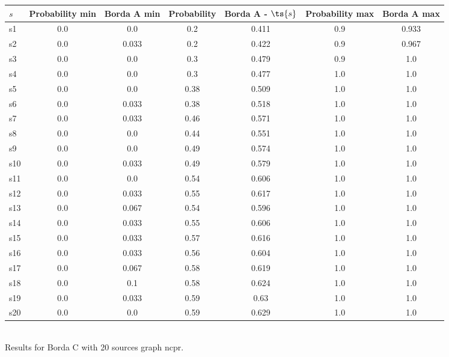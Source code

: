 \documentclass{article}
\begin{document}
\noindent\begin{tabular}{|l|c|c|c|c|c|c|}
\hline
$s$& Probability min & Borda A min & Probability & Borda A - $\ts{s}$ & Probability max & Borda A max\\
\hline
s1 &0.0 & 0.0 & 0.2 & 0.411 & 0.9 & 0.933\\
\hline
s2 &0.0 & 0.033 & 0.2 & 0.422 & 0.9 & 0.967\\
\hline
s3 &0.0 & 0.0 & 0.3 & 0.479 & 0.9 & 1.0\\
\hline
s4 &0.0 & 0.0 & 0.3 & 0.477 & 1.0 & 1.0\\
\hline
s5 &0.0 & 0.0 & 0.38 & 0.509 & 1.0 & 1.0\\
\hline
s6 &0.0 & 0.033 & 0.38 & 0.518 & 1.0 & 1.0\\
\hline
s7 &0.0 & 0.033 & 0.46 & 0.571 & 1.0 & 1.0\\
\hline
s8 &0.0 & 0.0 & 0.44 & 0.551 & 1.0 & 1.0\\
\hline
s9 &0.0 & 0.0 & 0.49 & 0.574 & 1.0 & 1.0\\
\hline
s10 &0.0 & 0.033 & 0.49 & 0.579 & 1.0 & 1.0\\
\hline
s11 &0.0 & 0.0 & 0.54 & 0.606 & 1.0 & 1.0\\
\hline
s12 &0.0 & 0.033 & 0.55 & 0.617 & 1.0 & 1.0\\
\hline
s13 &0.0 & 0.067 & 0.54 & 0.596 & 1.0 & 1.0\\
\hline
s14 &0.0 & 0.033 & 0.55 & 0.606 & 1.0 & 1.0\\
\hline
s15 &0.0 & 0.033 & 0.57 & 0.616 & 1.0 & 1.0\\
\hline
s16 &0.0 & 0.033 & 0.56 & 0.604 & 1.0 & 1.0\\
\hline
s17 &0.0 & 0.067 & 0.58 & 0.619 & 1.0 & 1.0\\
\hline
s18 &0.0 & 0.1 & 0.58 & 0.624 & 1.0 & 1.0\\
\hline
s19 &0.0 & 0.033 & 0.59 & 0.63 & 1.0 & 1.0\\
\hline
s20 &0.0 & 0.0 & 0.59 & 0.629 & 1.0 & 1.0\\
\hline
\end{tabular}\\

\noindent Results for Borda C with 20 sources graph ncpr.
\end{document}
